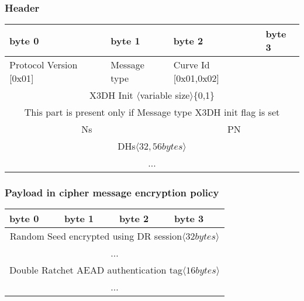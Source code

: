 \documentclass[a4paper,11pt]{article}
\begin{document}
      \subsubsection{Header}
      \label{subsubsec:protocol_doubleratchet_header}
      \begin{center}
      \begin{tabular}{ | p{1.4in} | p{1.4in} | p{1.4in} | p{1.4in} |}
        \hline
        \cellcolor[gray]{0.85} byte 0 & \cellcolor[gray]{0.85} byte 1 & \cellcolor[gray]{0.85} byte 2 & \cellcolor[gray]{0.85}byte 3\\
        \hline
        Protocol Version [0x01] & Message type & Curve Id [0x01,0x02] & \\
        \cline{1-3}
        \multicolumn{4}{|c|}{X3DH Init $\langle $variable size$\rangle $\{0,1\}}\\
        \multicolumn{4}{|c|}{This part is present only if Message type X3DH init flag is set}\\
        \hline
        \multicolumn{2}{|c}{Ns}&\multicolumn{2}{|c|}{PN}\\
        \hline
        \multicolumn{4}{|c|}{DHs$\langle 32,56 bytes\rangle $}\\
        \multicolumn{4}{|c|}{...}\\
        \hline
      \end{tabular}
      \end{center}

      \subsubsection{Payload in cipher message encryption policy}
      \begin{center}
      \begin{tabular}{ | p{1.4in} | p{1.4in} | p{1.4in} | p{1.4in} |}
        \hline
        \cellcolor[gray]{0.85} byte 0 & \cellcolor[gray]{0.85} byte 1 & \cellcolor[gray]{0.85} byte 2 & \cellcolor[gray]{0.85}byte 3\\
        \hline
        \multicolumn{4}{|c|}{Random Seed encrypted using DR session$\langle 32bytes\rangle $}\\
        \multicolumn{4}{|c|}{...}\\
        \hline
        \multicolumn{4}{|c|}{Double Ratchet AEAD authentication tag$\langle 16bytes\rangle $}\\
        \multicolumn{4}{|c|}{...}\\
        \hline
      \end{tabular}
      \end{center}
      
\end{document}
